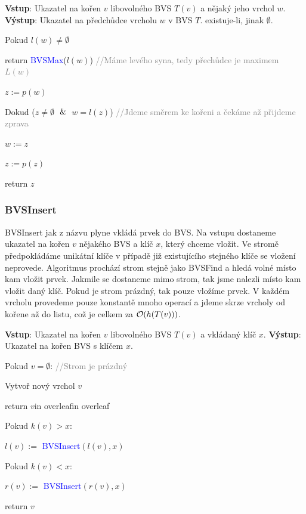 \noindent \textbf{Vstup}: Ukazatel na kořen $v$ libovolného BVS $T(v)$ a nějaký jeho vrchol $w$. \newline
\noindent \textbf{Výstup}: Ukazatel na předchůdce vrcholu $w$ v BVS $T$.
existuje-li, jinak $\emptyset$. \newline
{}
\begin{pseudocode}
    \item Pokud $l(w) \neq \emptyset$
    \item \tab return \textcolor{blue}{BVSMax}($l(w)$) \textcolor{gray}{//Máme levého syna, tedy přechůdce je maximem $L(w)$}
    \item $z := p(w)$
    \item Dokud ($z \neq \emptyset$ $\And$ $w = l(z)$) \textcolor{gray}{//Jdeme směrem ke kořeni a čekáme až přijdeme zprava}
    \item \tab $w := z$
    \item \tab $z := p(z)$
    \item return $z$
\end{pseudocode} \bigskip

\subsubsection{BVSInsert}

\noindent BVSInsert jak z názvu plyne vkládá prvek do BVS. Na vstupu dostaneme ukazatel na kořen $v$ nějakého BVS a klíč $x$, který chceme vložit. Ve stromě předpokládáme unikátní klíče v případě již existujícího stejného klíče se vložení neprovede. Algoritmus prochází strom stejně jako BVSFind a hledá volné místo kam vložit prvek. Jakmile se dostaneme mimo strom, tak jsme nalezli místo kam vložit daný klíč. Pokud je strom prázdný, tak pouze vložíme prvek. V každém vrcholu provedeme pouze konstantě mnoho operací a jdeme skrze vrcholy od kořene až do listu, což je celkem za $\mathcal{O}(h(T(v)))$. \bigskip

\noindent \textbf{Vstup}: Ukazatel na kořen $v$ libovolného BVS $T(v)$ a vkládaný klíč $x$. \newline
\noindent \textbf{Výstup}: Ukazatel na kořen BVS s klíčem $x$. \newline
{}
\begin{pseudocode}
    \item Pokud $v = \emptyset$: \textcolor{gray}{//Strom je prázdný}
    \item \tab Vytvoř nový vrchol $v$
    \item \tab return $v$in overleafin overleaf
    \item Pokud $k(v) > x$:
    \item \tab $l(v) :=$ \textcolor{blue}{BVSInsert}$(l(v), x)$
    \item Pokud $k(v) < x$:
    \item \tab $r(v) :=$ \textcolor{blue}{BVSInsert}$(r(v), x)$
    \item return $v$
\end{pseudocode} \bigskip

